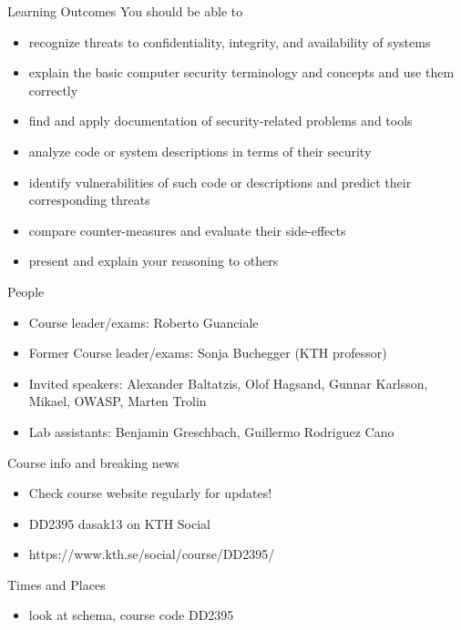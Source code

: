 \documentclass{beamer}
\begin{document}
\begin{frame}{Learning Outcomes}
  You should be able to
  \begin{itemize}
    \item recognize threats to confidentiality, integrity, and
      availability of systems
    \item explain the basic computer security terminology and concepts
      and use them correctly 
    \item find and apply documentation of security-related problems
      and tools 
    \item analyze code or system descriptions in terms
      of their security
    \item identify vulnerabilities of such code or descriptions and
      predict their corresponding threats
    \item compare counter-measures and evaluate their side-effects
    \item present and explain your reasoning to others
  \end{itemize}
\end{frame}

\begin{frame}{People}
  \begin{itemize}
    \item Course leader/exams: Roberto Guanciale
    \item Former Course leader/exams: Sonja Buchegger (KTH professor)
    \item Invited speakers:
      Alexander Baltatzis,
      Olof Hagsand,
      Gunnar Karlsson,
      Mikael,
      OWASP,
      Marten Trolin 
    \item Lab assistants: 
      Benjamin Greschbach,
      Guillermo Rodriguez Cano
  \end{itemize}
\end{frame}

\begin{frame}{Course info and breaking news}
  \begin{itemize}
    \item Check course website regularly for updates!
    \item DD2395 dasak13 on KTH Social
    \item https://www.kth.se/social/course/DD2395/
  \end{itemize}
\end{frame}

\begin{frame}{Times and Places}
  \begin{itemize}
    \item look at schema, course code DD2395
  \end{itemize}
\end{frame}
\end{document}
